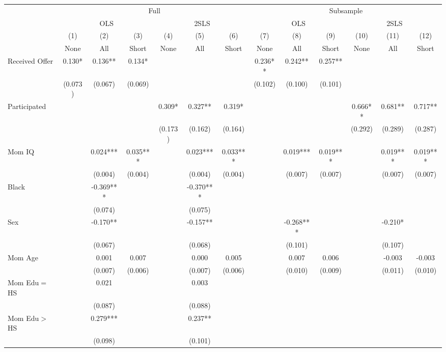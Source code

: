 \begin{tabular}{lcccccccccccc}
\toprule 
\midrule 
 & \multicolumn{6}{c}{Full} & \multicolumn{6}{c}{Subsample} \\
 \cmidrule(lr){2-7} \cmidrule(lr){8-13} 
 & \multicolumn{3}{c}{OLS} & \multicolumn{3}{c}{2SLS} & \multicolumn{3}{c}{OLS} & \multicolumn{3}{c}{2SLS} \\
 \cmidrule(lr){2-4} \cmidrule(lr){5-7} \cmidrule(lr){8-10} \cmidrule(lr){11-13} 
 & (1) & (2) & (3) & (4) & (5) & (6) & (7) & (8) & (9) & (10) & (11) & (12) \\
 & None & All & Short & None & All & Short & None & All & Short & None & All & Short \\
\midrule 
Received Offer & 0.130* & 0.136** & 0.134* &  &  &  & 0.236** & 0.242** & 0.257** &  &  &  \\
 & (0.073) & (0.067) & (0.069) &  &  &  & (0.102) & (0.100) & (0.101) &  &  &  \\
Participated &  &  &  & 0.309* & 0.327** & 0.319* &  &  &  & 0.666** & 0.681** & 0.717** \\
 &  &  &  & (0.173) & (0.162) & (0.164) &  &  &  & (0.292) & (0.289) & (0.287) \\
Mom IQ &  & 0.024*** & 0.035*** &  & 0.023*** & 0.033*** &  & 0.019*** & 0.019*** &  & 0.019*** & 0.019*** \\
 &  & (0.004) & (0.004) &  & (0.004) & (0.004) &  & (0.007) & (0.007) &  & (0.007) & (0.007) \\
Black &  & -0.369*** &  &  & -0.370*** &  &  &  &  &  &  &  \\
 &  & (0.074) &  &  & (0.075) &  &  &  &  &  &  &  \\
Sex &  & -0.170** &  &  & -0.157** &  &  & -0.268*** &  &  & -0.210* &  \\
 &  & (0.067) &  &  & (0.068) &  &  & (0.101) &  &  & (0.107) &  \\
Mom Age &  & 0.001 & 0.007 &  & 0.000 & 0.005 &  & 0.007 & 0.006 &  & -0.003 & -0.003 \\
 &  & (0.007) & (0.006) &  & (0.007) & (0.006) &  & (0.010) & (0.009) &  & (0.011) & (0.010) \\
Mom Edu$=$HS &  & 0.021 &  &  & 0.003 &  &  &  &  &  &  &  \\
 &  & (0.087) &  &  & (0.088) &  &  &  &  &  &  &  \\
Mom Edu$>$HS &  & 0.279*** &  &  & 0.237** &  &  &  &  &  &  &  \\
 &  & (0.098) &  &  & (0.101) &  &  &  &  &  &  &  \\

\end{tabular}
